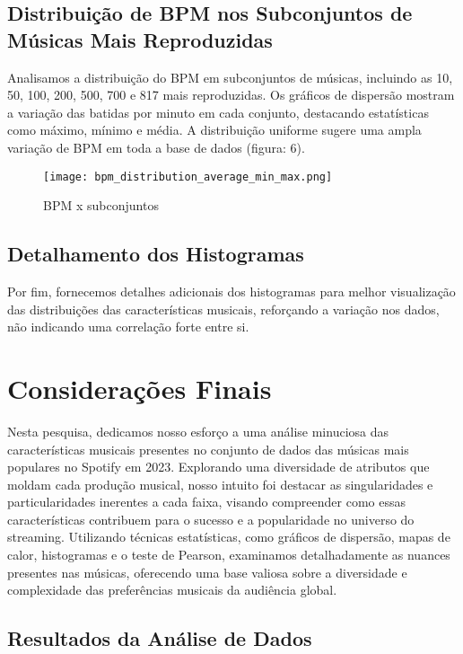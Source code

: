 \documentclass[12pt]{article}
\begin{document}
\subsection{Distribuição de BPM nos Subconjuntos de Músicas Mais Reproduzidas}

Analisamos a distribuição do BPM em subconjuntos de músicas, incluindo as 10, 50, 100, 200, 500, 700 e 817 mais reproduzidas. Os gráficos de dispersão mostram a variação das batidas por minuto em cada conjunto, destacando estatísticas como máximo, mínimo e média. A distribuição uniforme sugere uma ampla variação de BPM em toda a base de dados (figura: 6).

\begin{figure}[ht]
\centering
\texttt{[image: bpm\_distribution\_average\_min\_max.png]}
\caption{BPM x subconjuntos}
\label{fig:exampleFig6}
\end{figure}

\subsection{Detalhamento dos Histogramas}

Por fim, fornecemos detalhes adicionais dos histogramas para melhor visualização das distribuições das características musicais, reforçando a variação nos dados, não indicando uma correlação forte entre si.



\section{Considerações Finais}

Nesta pesquisa, dedicamos nosso esforço a uma análise minuciosa das características musicais presentes no conjunto de dados das músicas mais populares no Spotify em 2023. Explorando uma diversidade de atributos que moldam cada produção musical, nosso intuito foi destacar as singularidades e particularidades inerentes a cada faixa, visando compreender como essas características contribuem para o sucesso e a popularidade no universo do streaming. Utilizando técnicas estatísticas, como gráficos de dispersão, mapas de calor, histogramas e o teste de Pearson, examinamos detalhadamente as nuances presentes nas músicas, oferecendo uma base valiosa sobre a diversidade e complexidade das preferências musicais da audiência global.

\subsection{Resultados da Análise de Dados}
\end{document}
